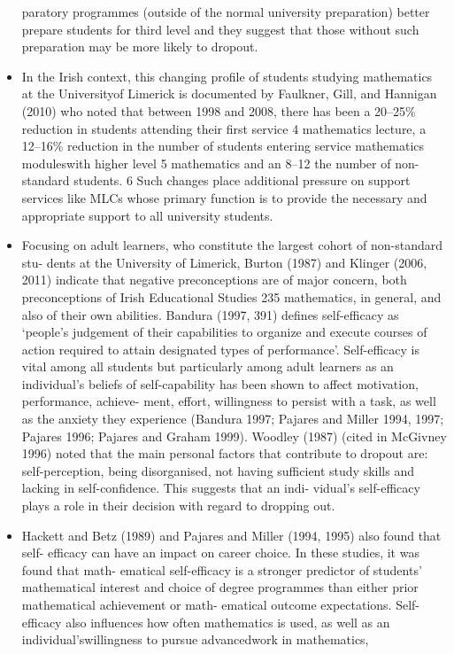 \documentclass[twoside,12pt,a4paper]{report}
\begin{document}
\begin{itemize}
paratory programmes (outside of the normal university preparation) better prepare
students for third level and they suggest that those without such preparation may
be more likely to dropout.
	\item In the Irish context,
this changing profile of students studying mathematics at the Universityof Limerick is
documented by Faulkner, Gill, and Hannigan (2010) who noted that between 1998
and 2008, there has been a 20–25\% reduction in students attending their first
service 4 mathematics lecture, a 12–16\% reduction in the number of students entering
service mathematics moduleswith higher level 5 mathematics and an 8–12%
the number of non-standard students. 6 Such changes place additional pressure on
support services like MLCs whose primary function is to provide the necessary and
appropriate support to all university students.
	\item Focusing on adult learners, who constitute the largest cohort of non-standard stu-
dents at the University of Limerick, Burton (1987) and Klinger (2006, 2011) indicate
that negative preconceptions are of major concern, both preconceptions of
Irish Educational Studies 235
mathematics, in general, and also of their own abilities. Bandura (1997, 391) defines
self-efficacy as ‘people’s judgement of their capabilities to organize and execute
courses of action required to attain designated types of performance’. Self-efficacy
is vital among all students but particularly among adult learners as an individual’s
beliefs of self-capability has been shown to affect motivation, performance, achieve-
ment, effort, willingness to persist with a task, as well as the anxiety they experience
(Bandura 1997; Pajares and Miller 1994, 1997; Pajares 1996; Pajares and Graham
1999). Woodley (1987) (cited in McGivney 1996) noted that the main personal
factors that contribute to dropout are: self-perception, being disorganised, not
having sufficient study skills and lacking in self-confidence. This suggests that an indi-
vidual’s self-efficacy plays a role in their decision with regard to dropping out.
	\item Hackett and Betz (1989) and Pajares and Miller (1994, 1995) also found that self-
efficacy can have an impact on career choice. In these studies, it was found that math-
ematical self-efficacy is a stronger predictor of students’ mathematical interest and
choice of degree programmes than either prior mathematical achievement or math-
ematical outcome expectations. Self-efficacy also influences how often mathematics
is used, as well as an individual’swillingness to pursue advancedwork in mathematics,

\end{itemize}
\end{document}

